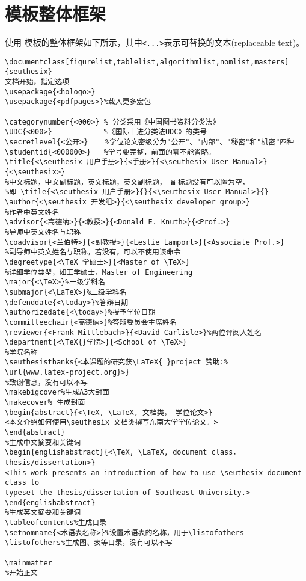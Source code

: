 \documentclass[figurelist,tablelist,algorithmlist,nomlist,masters]{seuthesix}
\begin{document}
\section{模板整体框架}
使用 \seuthesix 模板的整体框架如下所示，其中\verb+<...>+表示可替换的文本(replaceable text)。
{\color{magenta}
\begin{verbatim}
\documentclass[figurelist,tablelist,algorithmlist,nomlist,masters]{seuthesix}
文档开始，指定选项
\usepackage{<hologo>}
\usepackage{<pdfpages>}%载入更多宏包

\categorynumber{<000>} % 分类采用《中国图书资料分类法》
\UDC{<000>}            %《国际十进分类法UDC》的类号
\secretlevel{<公开>}    %学位论文密级分为"公开"、"内部"、"秘密"和"机密"四种
\studentid{<000000>}   %学号要完整，前面的零不能省略。
\title{<\seuthesix 用户手册>}{<手册>}{<\seuthesix User Manual>}{<\seuthesix>}
%中文标题，中文副标题，英文标题，英文副标题， 副标题没有可以置为空， 
%即 \title{<\seuthesix 用户手册>}{}{<\seuthesix User Manual>}{}
\author{<\seuthesix 开发组>}{<\seuthesix developer group>}
%作者中英文姓名
\advisor{<高德纳>}{<教授>}{<Donald E. Knuth>}{<Prof.>}
%导师中英文姓名与职称
\coadvisor{<兰伯特>}{<副教授>}{<Leslie Lamport>}{<Associate Prof.>} 
%副导师中英文姓名与职称，若没有，可以不使用该命令
\degreetype{<\TeX 学硕士>}{<Master of \TeX>} 
%详细学位类型，如工学硕士，Master of Engineering
\major{<\TeX>}%一级学科名
\submajor{<\LaTeX>}%二级学科名
\defenddate{<\today>}%答辩日期
\authorizedate{<\today>}%授予学位日期
\committeechair{<高德纳>}%答辩委员会主席姓名
\reviewer{<Frank Mittlebach>}{<David Carlisle>}%两位评阅人姓名
\department{<\TeX{}学院>}{<School of \TeX>}
%学院名称
\seuthesisthanks{<本课题的研究获\LaTeX{ }project 赞助:%
\url{www.latex-project.org}>}
%致谢信息，没有可以不写
\makebigcover%生成A3大封面
\makecover% 生成封面
\begin{abstract}{<\TeX, \LaTeX, 文档类， 学位论文>}
<本文介绍如何使用\seuthesix 文档类撰写东南大学学位论文。>
\end{abstract}
%生成中文摘要和关键词
\begin{englishabstract}{<\TeX, \LaTeX, document class， thesis/dissertation>}
<This work presents an introduction of how to use \seuthesix document class to 
typeset the thesis/dissertation of Southeast University.>
\end{englishabstract}
%生成英文摘要和关键词
\tableofcontents%生成目录
\setnomname{<术语表名称>}%设置术语表的名称，用于\listofothers
\listofothers%生成图、表等目录，没有可以不写

\mainmatter
%开始正文


\end{verbatim}}
\end{document}
